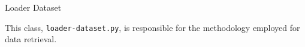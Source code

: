 \begin{subsection}{Loader Dataset}
    \label{subsubsec:loader-dataset}
    \par This class, \texttt{loader-dataset.py}, is responsible for the methodology employed for data retrieval.
\end{subsection}